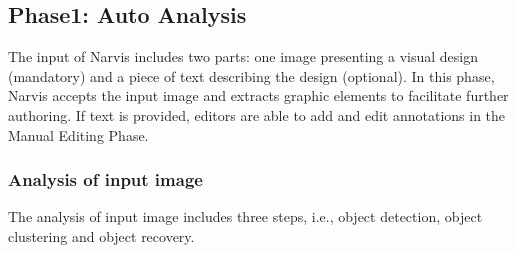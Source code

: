 


\subsection{Phase1: Auto Analysis}


The input of Narvis includes two parts: one image presenting a visual design (mandatory) and a piece of text describing the design (optional). In this phase, Narvis accepts the input image and extracts graphic elements to facilitate further authoring. If text is provided, editors are able to add and edit annotations in the Manual Editing Phase.

\subsubsection{Analysis of input image}
The analysis of input image includes three steps, i.e., object detection, object clustering and object recovery.


